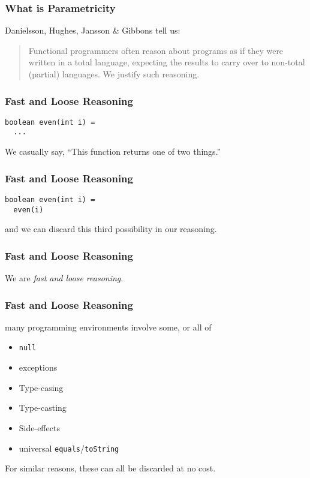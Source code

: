 \begin{frame}
\frametitle{What is Parametricity}
\begin{block}{Danielsson, Hughes, Jansson \& Gibbons \cite{danielsson2006fast} tell us:}
\begin{quotation}
Functional programmers often reason about programs as if
they were written in a total language, expecting the results
to carry over to non-total (partial) languages. We justify
such reasoning.
\end{quotation}
\end{block}
\end{frame}

\begin{frame}[fragile]
\frametitle{Fast and Loose Reasoning}
\begin{lstlisting}
boolean even(int i) =
  ...
\end{lstlisting}
We casually say, ``This function returns one of two things.''
\end{frame}

\begin{frame}[fragile]
\frametitle{Fast and Loose Reasoning}
\begin{lstlisting}
boolean even(int i) =
  even(i)
\end{lstlisting}
and we can discard this third possibility in our reasoning.
\end{frame}

\begin{frame}[fragile]
\frametitle{Fast and Loose Reasoning}
\begin{center}
We are \emph{fast and loose reasoning}.
\end{center}
\end{frame}

\begin{frame}[fragile]
\frametitle{Fast and Loose Reasoning}
\begin{block}{many programming environments involve some, or all of}
\begin{itemize}
  \item \lstinline{null}
  \item exceptions
  \item Type-casing
  \item Type-casting
  \item Side-effects
  \item universal \lstinline{equals}/\lstinline{toString}
\end{itemize}
\end{block}
For similar reasons, these can all be discarded at no cost.
\end{frame}

